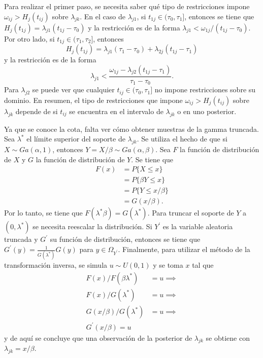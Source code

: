 \documentclass[11pt,a4paper]{article}
\begin{document}
Para realizar el primer paso, se necesita saber qué tipo de restricciones impone $\omega_{ij} > H_j(t_{ij})$ sobre $\lambda_{jk}$. En el caso de $\lambda_{j1}$, si $t_{1j} \in (\tau_0, \tau_1]$, entonces se tiene que $H_j(t_{1j}) = \lambda_{j1}(t_{1j} - \tau_0)$ y la restricción es de la forma $\lambda_{j1} < \omega_{1j} / (t_{1j} - \tau_0)$. Por otro lado, si $t_{1j} \in (\tau_1, \tau_2]$, entonces $$H_j(t_{1j}) = \lambda_{j1}(\tau_1 - \tau_0) + \lambda_{2j}(t_{1j} - \tau_1)$$ y la restricción es de la forma $$\lambda_{j1} < \frac{\omega_{1j}-\lambda_{j2}(t_{1j} - \tau_1)}{\tau_1 - \tau_0}.$$ Para $\lambda_{j2}$ se puede ver que cualquier $t_{ij} \in (\tau_0, \tau_1]$ no impone restricciones sobre su dominio. En resumen, el tipo de restricciones que impone $\omega_{ij} > H_j(t_{ij})$ sobre $\lambda_{jk}$ depende de si $t_{ij}$ se encuentra en el intervalo de $\lambda_{jk}$ o en uno posterior.

Ya que se conoce la cota, falta ver cómo obtener muestras de la gamma truncada. Sea $\lambda^*$ el límite superior del soporte de $\lambda_{jk}$. Se utiliza el hecho de que si $X \sim Ga(\alpha, 1)$, entonces $Y = X/\beta \sim Ga(\alpha, \beta)$. Sea $F$ la función de distribución de $X$ y $G$ la función de distribución de $Y$. Se tiene que
\begin{align*}
F(x) &= P\lbrace X \leq x\rbrace\\
&= P\lbrace \beta Y \leq x \rbrace\\
&= P\lbrace Y \leq x/\beta \rbrace\\
&= G(x/\beta).
\end{align*}
Por lo tanto, se tiene que $F(\lambda^* \beta) = G(\lambda^*)$. Para truncar el soporte de $Y$ a $(0, \lambda^*)$ se necesita reescalar la distribución. Si $Y^\prime$ es la variable aleatoria truncada y $G^\prime$ su función de distribución, entonces se tiene que $G^\prime (y) = \frac{1}{G(\lambda^*)} G(y)$ para $y \in \Omega_{Y^\prime}$. Finalmente, para utilizar el método de la transformación inversa, se simula $u\sim U(0, 1)$ y se toma $x$ tal que
\begin{align*}
F(x) / F(\beta \lambda^*) &= u \implies\\
F(x) / G(\lambda^*) &= u \implies\\
G(x/\beta) / G(\lambda^*) &= u \implies\\
G^\prime (x/\beta) = u
\end{align*}
y de aquí se concluye que una observación de la posterior de $\lambda_{jk}$ se obtiene con $\lambda_{jk} = x/\beta$.
\end{document}
